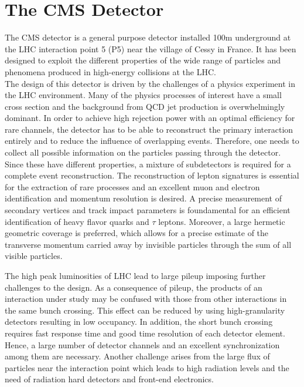 \section{The CMS Detector}
\label{sec:CMSdetector}

The CMS detector is a general purpose detector installed 100\unit{m} underground at the LHC interaction point 5 (P5) near the village of Cessy in France.
It has been designed to exploit the different properties of the wide range of particles and phenomena produced in high-energy collisions at the LHC.\\

The design of this detector is driven by the challenges of a physics experiment in the LHC environment. 
Many of the physics processes of interest have a small cross section and the background from QCD jet production is overwhelmingly dominant.
In order to achieve high rejection power with an optimal efficiency for rare channels, the detector has to be able to reconstruct the primary interaction entirely and to reduce the influence of overlapping events. Therefore, one needs to collect all possible information on the particles passing through the detector. Since these have different properties, a mixture of subdetectors is required for a complete event reconstruction. The reconstruction of lepton signatures is essential for the extraction of rare processes and an excellent muon and electron identification and momentum resolution is desired. A precise measurement of secondary vertices and track impact parameters is foundamental for an efficient identification of heavy flavor quarks and $\tau$ leptons. Moreover, a large hermetic geometric coverage is preferred, which allows for a precise estimate of the transverse momentum carried away by invisible particles through the sum of all visible particles.

The high peak luminosities of LHC lead to large pileup imposing further challenges to the design. As a consequence of pileup, the products of an interaction under study may be confused with those from other interactions in the same bunch crossing. This effect can be reduced by using high-granularity detectors resulting in low occupancy. In addition, the short bunch crossing requires fast response time and good time resolution of each detector element.
Hence, a large number of detector channels and an excellent synchronization among them are necessary. Another challenge arises from the large flux of particles near the interaction point which leads to high radiation levels and the need of radiation hard detectors and front-end electronics.\\

